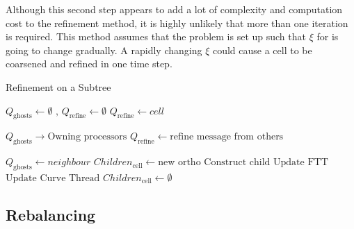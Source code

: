 \documentclass{IIBproject}
\begin{document}
Although this second step appears to add a lot of complexity and computation cost to the refinement method, it is highly unlikely that more than one iteration is required. This method assumes that the problem is set up such that $\xi$ for is going to change gradually. A rapidly changing $\xi$ could cause a cell to be coarsened and refined in one time step. 

\begin{algorithm}[H]
\caption{Refinement on a Subtree}
\label{alg:refine}

\begin{algorithmic}
	\State $Q_{\mathrm{ghosts}} \gets \emptyset \text{ , } Q_{\mathrm{refine}} \gets \emptyset$
			\State $Q_{\mathrm{refine}} \gets cell$
			\State {}
		\EndIf
	\EndFor
	\Statex
	\Repeat
			\State {}
			\State {}
		\EndFor

		\State $Q_\mathrm{ghosts} \to \text{Owning processors}$
		\State $Q_{\mathrm{refine}} \gets \text{refine message from others}$
\EndFunction
\end{algorithmic}
\end{algorithm}

\begin{algorithm}
\begin{algorithmic}
				\State $Q_\mathrm{ghosts} \gets neighbour$
			\Else
				\State {}
				\State {}
			\EndIf
		\EndIf
	\EndFor
\EndFunction
\Statex
{}
	\State $Children_{\mathrm{cell}} \gets \text{new ortho}$
		\State $\text{Construct child}$
		\State $\text{Update FTT}$
	\EndFor
	\State $\text{Update Curve Thread}$
\EndFunction
\Statex
{}
	\State $Children_{\mathrm{cell}} \gets \emptyset$
\EndFunction
\end{algorithmic}
\end{algorithm}

\subsection{Rebalancing}
\end{document}
